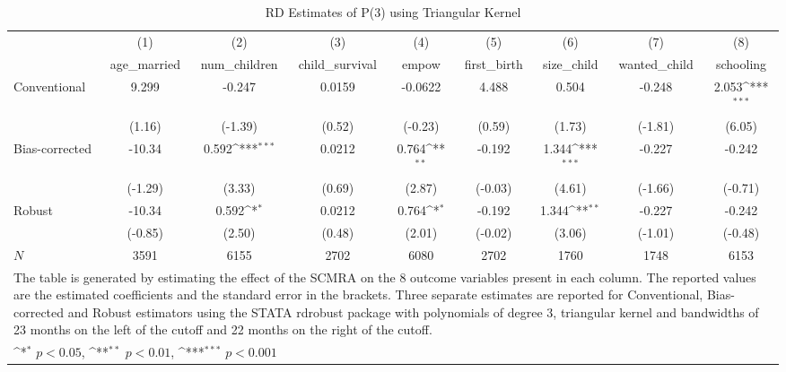 \begin{table}[htbp]\centering
\def\sym#1{\ifmmode^{#1}\else\(^{#1}\)\fi}
\caption{RD Estimates of P(3) using Triangular Kernel}
\begin{tabular}{l*{8}{c}}
\toprule
            &\multicolumn{1}{c}{(1)}&\multicolumn{1}{c}{(2)}&\multicolumn{1}{c}{(3)}&\multicolumn{1}{c}{(4)}&\multicolumn{1}{c}{(5)}&\multicolumn{1}{c}{(6)}&\multicolumn{1}{c}{(7)}&\multicolumn{1}{c}{(8)}\\
            &\multicolumn{1}{c}{age\_married}&\multicolumn{1}{c}{num\_children}&\multicolumn{1}{c}{child\_survival}&\multicolumn{1}{c}{empow}&\multicolumn{1}{c}{first\_birth}&\multicolumn{1}{c}{size\_child}&\multicolumn{1}{c}{wanted\_child}&\multicolumn{1}{c}{schooling}\\
\midrule
Conventional&       9.299         &      -0.247         &      0.0159         &     -0.0622         &       4.488         &       0.504         &      -0.248         &       2.053\sym{***}\\
            &      (1.16)         &     (-1.39)         &      (0.52)         &     (-0.23)         &      (0.59)         &      (1.73)         &     (-1.81)         &      (6.05)         \\
\addlinespace
Bias-corrected&      -10.34         &       0.592\sym{***}&      0.0212         &       0.764\sym{**} &      -0.192         &       1.344\sym{***}&      -0.227         &      -0.242         \\
            &     (-1.29)         &      (3.33)         &      (0.69)         &      (2.87)         &     (-0.03)         &      (4.61)         &     (-1.66)         &     (-0.71)         \\
\addlinespace
Robust      &      -10.34         &       0.592\sym{*}  &      0.0212         &       0.764\sym{*}  &      -0.192         &       1.344\sym{**} &      -0.227         &      -0.242         \\
            &     (-0.85)         &      (2.50)         &      (0.48)         &      (2.01)         &     (-0.02)         &      (3.06)         &     (-1.01)         &     (-0.48)         \\
\midrule
\(N\)       &        3591         &        6155         &        2702         &        6080         &        2702         &        1760         &        1748         &        6153         \\
\bottomrule
\multicolumn{9}{l}{\footnotesize The table is generated by estimating the effect of the SCMRA on the 8 outcome variables present in each column. The reported values are the estimated coefficients and the standard error in the brackets. Three separate estimates are reported for Conventional, Bias-corrected and Robust estimators using the STATA rdrobust package with polynomials of degree 3, triangular kernel and bandwidths of 23 months on the left of the cutoff and 22 months on the right of the cutoff.}\\
\multicolumn{9}{l}{\footnotesize \sym{*} \(p<0.05\), \sym{**} \(p<0.01\), \sym{***} \(p<0.001\)}\\
\end{tabular}
\end{table}

